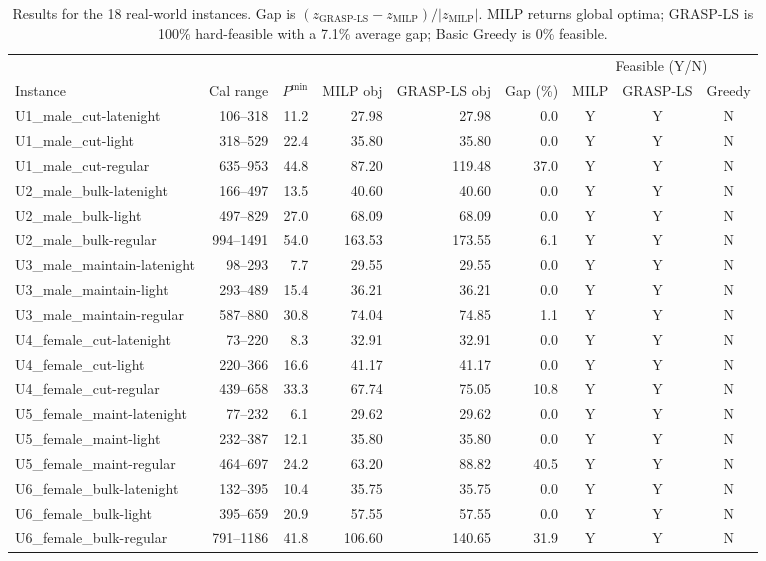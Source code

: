 \documentclass[a4paper]{article}
\begin{document}
\begin{table}[htbp]
\centering\small
\caption{Results for the 18 real-world instances. Gap is $(z_{\text{GRASP-LS}}-z_{\text{MILP}})/|z_{\text{MILP}}|$. MILP returns global optima; GRASP-LS is 100\% hard-feasible with a 7.1\% average gap; Basic Greedy is 0\% feasible.}
\label{tab:real}
\begin{tabular*}{\textwidth}{@{\extracolsep{\fill}}lrrrrrccc@{}}
\toprule
 & & & & & & \multicolumn{3}{c}{Feasible (Y/N)} \\
\cmidrule(lr){7-9}
Instance & Cal range & $P^{\min}$ & MILP obj & GRASP-LS obj & Gap (\%) & MILP & GRASP-LS & Greedy \\
\midrule
U1\_male\_cut-latenight & 106--318 & 11.2 & 27.98 & 27.98 & 0.0 & Y & Y & N \\
U1\_male\_cut-light & 318--529 & 22.4 & 35.80 & 35.80 & 0.0 & Y & Y & N \\
U1\_male\_cut-regular & 635--953 & 44.8 & 87.20 & 119.48 & 37.0 & Y & Y & N \\
U2\_male\_bulk-latenight & 166--497 & 13.5 & 40.60 & 40.60 & 0.0 & Y & Y & N \\
U2\_male\_bulk-light & 497--829 & 27.0 & 68.09 & 68.09 & 0.0 & Y & Y & N \\
U2\_male\_bulk-regular & 994--1491 & 54.0 & 163.53 & 173.55 & 6.1 & Y & Y & N \\
U3\_male\_maintain-latenight & 98--293 & 7.7 & 29.55 & 29.55 & 0.0 & Y & Y & N \\
U3\_male\_maintain-light & 293--489 & 15.4 & 36.21 & 36.21 & 0.0 & Y & Y & N \\
U3\_male\_maintain-regular & 587--880 & 30.8 & 74.04 & 74.85 & 1.1 & Y & Y & N \\
U4\_female\_cut-latenight & 73--220 & 8.3 & 32.91 & 32.91 & 0.0 & Y & Y & N \\
U4\_female\_cut-light & 220--366 & 16.6 & 41.17 & 41.17 & 0.0 & Y & Y & N \\
U4\_female\_cut-regular & 439--658 & 33.3 & 67.74 & 75.05 & 10.8 & Y & Y & N \\
U5\_female\_maint-latenight & 77--232 & 6.1 & 29.62 & 29.62 & 0.0 & Y & Y & N \\
U5\_female\_maint-light & 232--387 & 12.1 & 35.80 & 35.80 & 0.0 & Y & Y & N \\
U5\_female\_maint-regular & 464--697 & 24.2 & 63.20 & 88.82 & 40.5 & Y & Y & N \\
U6\_female\_bulk-latenight & 132--395 & 10.4 & 35.75 & 35.75 & 0.0 & Y & Y & N \\
U6\_female\_bulk-light & 395--659 & 20.9 & 57.55 & 57.55 & 0.0 & Y & Y & N \\
U6\_female\_bulk-regular & 791--1186 & 41.8 & 106.60 & 140.65 & 31.9 & Y & Y & N \\
\bottomrule
\end{tabular*}
\end{table}
\end{document}
